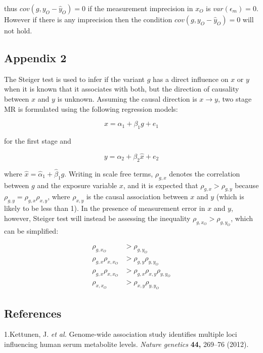 \documentclass[]{article}
\begin{document}
thus \(cov(g, y_O - \hat{y}_O) = 0\) if the measurement imprecision in
\(x_O\) is \(var(\epsilon_m) = 0\). However if there is any imprecision
then the condition \(cov(g, y_O - \hat{y}_O) = 0\) will not hold.

\newpage

\subsection{Appendix 2}\label{appendix-2}

The Steiger test is used to infer if the variant \(g\) has a direct
influence on \(x\) or \(y\) when it is known that it associates with
both, but the direction of causality between \(x\) and \(y\) is unknown.
Assuming the causal direction is \(x \to y\), two stage MR is formulated
using the following regression models:

\[
x = \alpha_1 + \beta_1 g + e_1
\]

for the first stage and

\[
y = \alpha_2 + \beta_2 \hat{x} + e_2
\]

where \(\hat{x} = \hat{\alpha}_1 + \hat{\beta}_1 g\). Writing in scale
free terms, \(\rho_{g, x}\) denotes the correlation between \(g\) and
the exposure variable \(x\), and it is expected that
\(\rho_{g, x} > \rho_{g, y}\) because
\(\rho_{g, y} = \rho_{g, x}\rho_{x, y}\), where \(\rho_{x, y}\) is the
causal association between \(x\) and \(y\) (which is likely to be less
than 1). In the presence of measurement error in \(x\) and \(y\),
however, Steiger test will instead be assessing the inequality
\(\rho_{g, x_O} > \rho_{g, y_O}\), which can be simplified:

\[
\begin{aligned}
\rho_{g, x_O} & > \rho_{g, y_O} \\
\rho_{g, x} \rho_{x, x_O} & > \rho_{g,y}\rho_{y,y_O}\\
\rho_{g, x} \rho_{x, x_O} & > \rho_{g,x}\rho_{x,y}\rho_{y,y_O}\\
\rho_{x, x_O} & > \rho_{x,y}\rho_{y,y_O}
\end{aligned}
\]

\newpage

\subsection*{References}\label{references}

1.Kettunen, J. \emph{et al.} Genome-wide association study identifies
multiple loci influencing human serum metabolite levels. \emph{Nature
genetics} \textbf{44,} 269--76 (2012).
\end{document}
